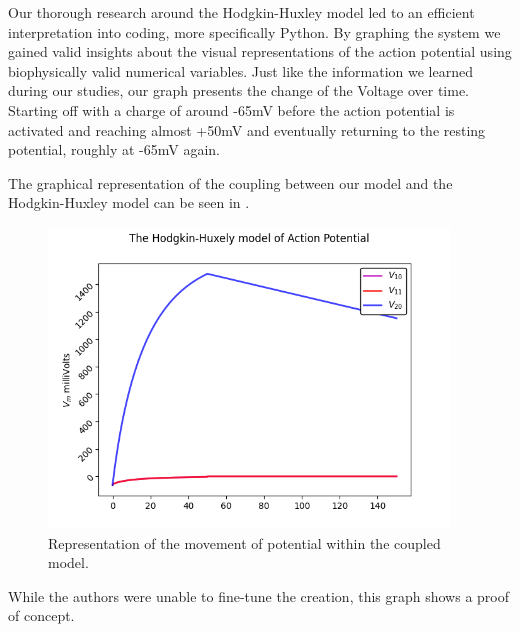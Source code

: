 \documentclass[class={myRUCProject}, crop=false]{standalone}
\begin{document}
Our thorough research around the Hodgkin-Huxley model led to an efficient interpretation into coding, more specifically Python. By graphing the system we gained valid insights about the visual representations of the action potential using biophysically valid numerical variables. Just like the information we learned during our studies, our graph presents the change of the Voltage over time. Starting off with a charge of around -65mV before the action potential is activated and reaching almost +50mV and eventually returning to the resting potential, roughly at -65mV again.

The graphical representation of the coupling between our model and the Hodgkin-Huxley model can be seen in . 
\begin{figure}
    \centering
    \includegraphics[trim=0 25 0 25,clip,width = 0.95\textwidth]{Pictures/Fuck.png}
    \caption{Representation of the movement of potential within the coupled model.}\label{fig:fuck}
\end{figure}
While the authors were unable to fine-tune the creation, this graph shows a proof of concept.
\end{document}
